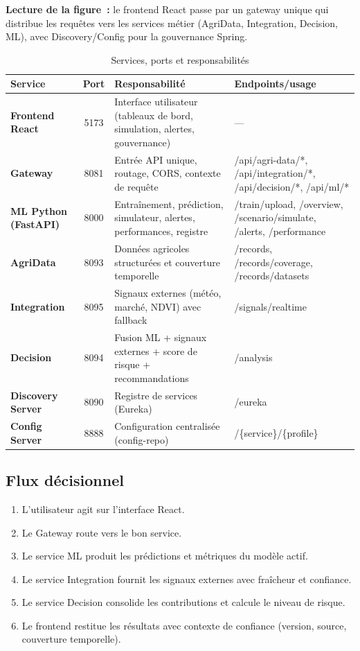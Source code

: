 \textbf{Lecture de la figure~:} le frontend React passe par un gateway unique qui distribue les requêtes vers les services métier (AgriData, Integration, Decision, ML), avec Discovery/Config pour la gouvernance Spring.

\begin{table}[H]
\centering
\caption{Services, ports et responsabilités}
\label{tab:services-architecture}
\renewcommand{\arraystretch}{1.25}
\begin{tabularx}{\textwidth}{|>{\bfseries}p{2.4cm}|c|>{\RaggedRight\arraybackslash}X|>{\RaggedRight\arraybackslash}X|}
\hline
\rowcolor{TableHeader}
Service & Port & Responsabilité & Endpoints/usage \\
\hline
Frontend React & 5173 & Interface utilisateur (tableaux de bord, simulation, alertes, gouvernance) & --- \\
\hline
Gateway & 8081 & Entrée API unique, routage, CORS, contexte de requête & /api/agri-data/*, /api/integration/*, /api/decision/*, /api/ml/* \\
\hline
ML Python (FastAPI) & 8000 & Entraînement, prédiction, simulateur, alertes, performances, registre & /train/upload, /overview, /scenario/simulate, /alerts, /performance \\
\hline
AgriData & 8093 & Données agricoles structurées et couverture temporelle & /records, /records/coverage, /records/datasets \\
\hline
Integration & 8095 & Signaux externes (météo, marché, NDVI) avec fallback & /signals/realtime \\
\hline
Decision & 8094 & Fusion ML + signaux externes + score de risque + recommandations & /analysis \\
\hline
Discovery Server & 8090 & Registre de services (Eureka) & /eureka \\
\hline
Config Server & 8888 & Configuration centralisée (config-repo) & /\{service\}/\{profile\} \\
\hline
\end{tabularx}
\end{table}

\subsection{Flux décisionnel}

\begin{enumerate}[leftmargin=1.5cm]
  \item L'utilisateur agit sur l'interface React.
  \item Le Gateway route vers le bon service.
  \item Le service ML produit les prédictions et métriques du modèle actif.
  \item Le service Integration fournit les signaux externes avec fraîcheur et confiance.
  \item Le service Decision consolide les contributions et calcule le niveau de risque.
  \item Le frontend restitue les résultats avec contexte de confiance (version, source, couverture temporelle).
\end{enumerate}

